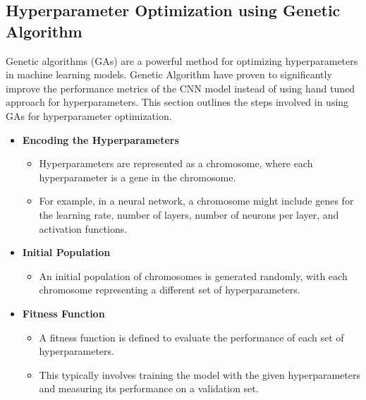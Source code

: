 \subsection{Hyperparameter Optimization using Genetic Algorithm}
Genetic algorithms (GAs) are a powerful method for optimizing hyperparameters
in machine learning models. Genetic Algorithm have proven to significantly
improve the performance metrics of the CNN model instead of using hand tuned
approach for hyperparameters. This section outlines the steps involved in using
GAs for hyperparameter optimization\cite{9058307}.
\begin{itemize}
    \item \textbf{Encoding the Hyperparameters}
          \begin{itemize}
              \item Hyperparameters are represented as a chromosome, where each hyperparameter is a
                    gene in the chromosome.
              \item For example, in a neural network, a chromosome might include genes for the
                    learning rate, number of layers, number of neurons per layer, and activation
                    functions.
          \end{itemize}

    \item \textbf{Initial Population}
          \begin{itemize}
              \item An initial population of chromosomes is generated randomly, with each
                    chromosome representing a different set of hyperparameters.
          \end{itemize}

    \item \textbf{Fitness Function}
          \begin{itemize}
              \item A fitness function is defined to evaluate the performance of each set of
                    hyperparameters.
              \item This typically involves training the model with the given hyperparameters and
                    measuring its performance on a validation set.
          \end{itemize}


\end{itemize}
